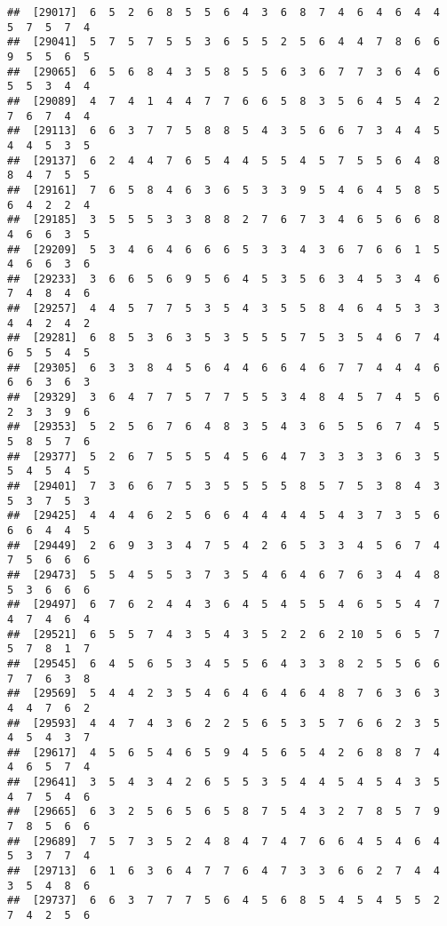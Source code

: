 \documentclass[
]{book}
\begin{document}
\begin{verbatim}
##  [29017]  6  5  2  6  8  5  5  6  4  3  6  8  7  4  6  4  6  4  4  5  7  5  7  4
##  [29041]  5  7  5  7  5  5  3  6  5  5  2  5  6  4  4  7  8  6  6  9  5  5  6  5
##  [29065]  6  5  6  8  4  3  5  8  5  5  6  3  6  7  7  3  6  4  6  5  5  3  4  4
##  [29089]  4  7  4  1  4  4  7  7  6  6  5  8  3  5  6  4  5  4  2  7  6  7  4  4
##  [29113]  6  6  3  7  7  5  8  8  5  4  3  5  6  6  7  3  4  4  5  4  4  5  3  5
##  [29137]  6  2  4  4  7  6  5  4  4  5  5  4  5  7  5  5  6  4  8  8  4  7  5  5
##  [29161]  7  6  5  8  4  6  3  6  5  3  3  9  5  4  6  4  5  8  5  6  4  2  2  4
##  [29185]  3  5  5  5  3  3  8  8  2  7  6  7  3  4  6  5  6  6  8  4  6  6  3  5
##  [29209]  5  3  4  6  4  6  6  6  5  3  3  4  3  6  7  6  6  1  5  4  6  6  3  6
##  [29233]  3  6  6  5  6  9  5  6  4  5  3  5  6  3  4  5  3  4  6  7  4  8  4  6
##  [29257]  4  4  5  7  7  5  3  5  4  3  5  5  8  4  6  4  5  3  3  4  4  2  4  2
##  [29281]  6  8  5  3  6  3  5  3  5  5  5  7  5  3  5  4  6  7  4  6  5  5  4  5
##  [29305]  6  3  3  8  4  5  6  4  4  6  6  4  6  7  7  4  4  4  6  6  6  3  6  3
##  [29329]  3  6  4  7  7  5  7  7  5  5  3  4  8  4  5  7  4  5  6  2  3  3  9  6
##  [29353]  5  2  5  6  7  6  4  8  3  5  4  3  6  5  5  6  7  4  5  5  8  5  7  6
##  [29377]  5  2  6  7  5  5  5  4  5  6  4  7  3  3  3  3  6  3  5  5  4  5  4  5
##  [29401]  7  3  6  6  7  5  3  5  5  5  5  8  5  7  5  3  8  4  3  5  3  7  5  3
##  [29425]  4  4  4  6  2  5  6  6  4  4  4  4  5  4  3  7  3  5  6  6  6  4  4  5
##  [29449]  2  6  9  3  3  4  7  5  4  2  6  5  3  3  4  5  6  7  4  7  5  6  6  6
##  [29473]  5  5  4  5  5  3  7  3  5  4  6  4  6  7  6  3  4  4  8  5  3  6  6  6
##  [29497]  6  7  6  2  4  4  3  6  4  5  4  5  5  4  6  5  5  4  7  4  7  4  6  4
##  [29521]  6  5  5  7  4  3  5  4  3  5  2  2  6  2 10  5  6  5  7  5  7  8  1  7
##  [29545]  6  4  5  6  5  3  4  5  5  6  4  3  3  8  2  5  5  6  6  7  7  6  3  8
##  [29569]  5  4  4  2  3  5  4  6  4  6  4  6  4  8  7  6  3  6  3  4  4  7  6  2
##  [29593]  4  4  7  4  3  6  2  2  5  6  5  3  5  7  6  6  2  3  5  4  5  4  3  7
##  [29617]  4  5  6  5  4  6  5  9  4  5  6  5  4  2  6  8  8  7  4  4  6  5  7  4
##  [29641]  3  5  4  3  4  2  6  5  5  3  5  4  4  5  4  5  4  3  5  4  7  5  4  6
##  [29665]  6  3  2  5  6  5  6  5  8  7  5  4  3  2  7  8  5  7  9  7  8  5  6  6
##  [29689]  7  5  7  3  5  2  4  8  4  7  4  7  6  6  4  5  4  6  4  5  3  7  7  4
##  [29713]  6  1  6  3  6  4  7  7  6  4  7  3  3  6  6  2  7  4  4  3  5  4  8  6
##  [29737]  6  6  3  7  7  7  5  6  4  5  6  8  5  4  5  4  5  5  2  7  4  2  5  6

\end{verbatim}
\end{document}
